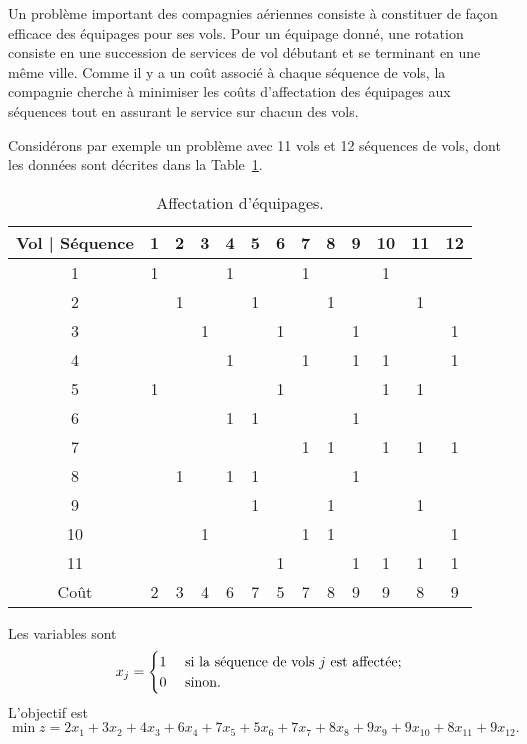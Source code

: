 \begin{example}
Un problème important des compagnies aériennes consiste à constituer de façon efficace des équipages pour ses vols.
Pour un équipage donné, une rotation consiste en une succession de services de vol débutant
et se terminant en une même ville.
Comme il y a un coût associé à chaque séquence de vols, la compagnie cherche à minimiser les coûts d'affectation des équipages aux séquences tout en assurant le service sur chacun des vols.

Considérons par exemple un problème avec 11 vols et 12 séquences de vols, dont les données sont décrites dans la Table~\ref{tab:flights}.
\begin{table}[htb]
\begin{center}
\begin{tabular}{|c|c|c|c|c|c|c|c|c|c|c|c|c|}
\hline
Vol | Séquence & 1 & 2 & 3 & 4 & 5 & 6 & 7 & 8 & 9 & 10 & 11 & 12 \\
\hline
1 & 1 & & & 1 & & & 1 & & & 1 & & \\
\hline
2 & & 1 & & & 1 & & & 1 & & & 1 & \\
\hline
3 & & & 1 & & & 1 & & & 1 & & & 1 \\
\hline
4 & & & & 1 & & & 1 & & 1 & 1 & & 1 \\
\hline
5 & 1 & & & & & 1 & & & & 1 & 1 & \\
\hline
6 & & & & 1 & 1 & & & & 1 & & & \\
\hline
7 & & & & & & & 1 & 1 & & 1 & 1 & 1 \\
\hline
8 & & 1 & & 1 & 1 & & & & 1 & & & \\
\hline
9 & & & & & 1 & & & 1 & & & 1 & \\
\hline
10 & & & 1 & & & & 1 & 1 & & & & 1 \\
\hline
11 & & & & & & 1 & & & 1 & 1 & 1 & 1 \\
\hline
Coût & 2 & 3 & 4 & 6 & 7 & 5 & 7 & 8 & 9 & 9 & 8 & 9 \\
\hline
\end{tabular}
\caption{Affectation d'équipages.}
\label{tab:flights}
\end{center}
\end{table}
Les variables sont
\[
x_j =
\begin{cases}
1 & \mbox{ si } \mbox{la séquence de vols $j$ est affectée};\\
0 & \mbox{ sinon}.
\end{cases}
\]
L'objectif est
\[
\min z = 2x_1 + 3x_2 + 4x_3 + 6x_4 + 7x_5 + 5x_6 + 7x_7 + 8x_8 + 9x_9 + 9x_{10} + 8x_{11} + 9x_{12}.
\]
\end{example}
